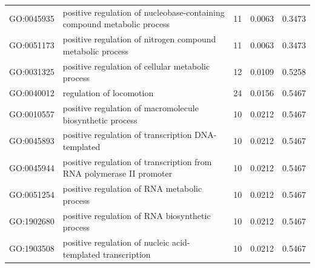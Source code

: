 \documentclass[10pt,letterpaper]{article}
\begin{document}
{\begin{table}[]
\begin{adjustwidth}{-2.25in}{}
\begin{tabular}{llccc}
GO:0045935          & positive regulation of nucleobase-containing compound metabolic process & 11                                                     & 0.0063                                               & 0.3473                                             \\
GO:0051173          & positive regulation of nitrogen compound metabolic process             & 11                                                     & 0.0063                                               & 0.3473                                             \\
GO:0031325          & positive regulation of cellular metabolic process                & 12                                                     & 0.0109                                               & 0.5258                                             \\
GO:0040012          & regulation of locomotion                                                                                           & 24                                                     & 0.0156                                               & 0.5467                                             \\
GO:0010557          & positive regulation of macromolecule biosynthetic process               & 10                                                     & 0.0212                                               & 0.5467                                             \\
GO:0045893          & positive regulation of transcription DNA-templated                & 10                                                     & 0.0212                                               & 0.5467                                             \\
GO:0045944          & positive regulation of transcription from RNA polymerase II promoter    & 10                                                     & 0.0212                                               & 0.5467                                             \\
GO:0051254          & positive regulation of RNA metabolic process                           & 10                                                     & 0.0212                                               & 0.5467                                             \\
GO:1902680          & positive regulation of RNA biosynthetic process                     & 10                                                     & 0.0212                                               & 0.5467                                             \\
GO:1903508          & positive regulation of nucleic acid-templated transcription           & 10                                                     & 0.0212                                               & 0.5467    \\\hline
\end{tabular}
\end{adjustwidth}
\end{table}

}
\end{document}
